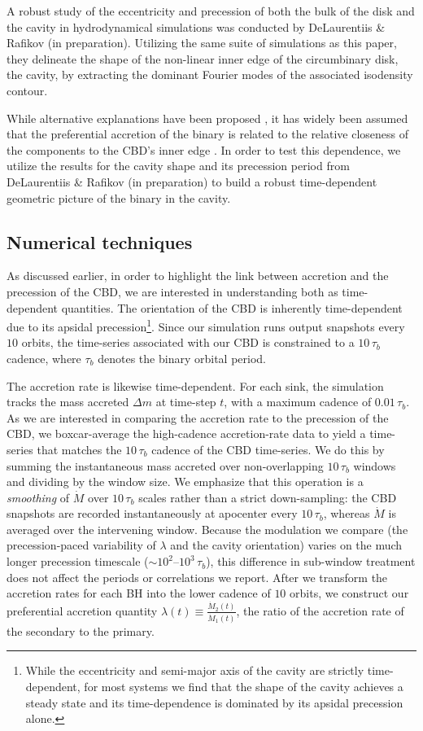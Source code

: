 \documentclass[fleqn,usenatbib]{mnras}
\begin{document}
A robust study of the eccentricity and precession of both the bulk of the disk and the cavity in hydrodynamical simulations was conducted by DeLaurentiis \& Rafikov (in preparation). Utilizing the same suite of simulations as this paper, they delineate the shape of the non-linear inner edge of the circumbinary disk, the cavity, by extracting the dominant Fourier modes of the associated isodensity contour.


While alternative explanations have been proposed \citep{Artimowicz_83_og_polish}, it has widely been assumed that the preferential accretion of the binary is related to the relative closeness of the components to the CBD's inner edge \citep{Dorazio+2013,Rafikov_16_accretion}. In order to test this dependence, we utilize the results for the cavity shape and its precession period from DeLaurentiis \& Rafikov (in preparation) to build a robust time-dependent geometric picture of the binary in the cavity.


\subsection{Numerical techniques}
As discussed earlier, in order to highlight the link between accretion and the precession of the CBD, we are interested in understanding both as time-dependent quantities. The orientation of the CBD is inherently time-dependent due to its apsidal precession\footnote{While the eccentricity and semi-major axis of the cavity are strictly time-dependent, for most systems we find that the shape of the cavity achieves a steady state and its time-dependence is dominated by its apsidal precession alone.}. Since our simulation runs output snapshots every $10$ orbits, the time-series associated with our CBD is constrained to a $10\,\tau_b$ cadence, where $\tau_b$ denotes the binary orbital period.


The accretion rate is likewise time-dependent. For each sink, the simulation tracks the mass accreted $\Delta m$ at time-step $t$, with a maximum cadence of $0.01\,\tau_b$. As we are interested in comparing the accretion rate to the precession of the CBD, we boxcar-average the high-cadence accretion-rate data to yield a time-series that matches the $10\,\tau_b$ cadence of the CBD time-series. We do this by summing the instantaneous mass accreted over non-overlapping $10\,\tau_b$ windows and dividing by the window size. We emphasize that this operation is a \textit{smoothing} of $\dot{M}$ over $10\,\tau_b$ scales rather than a strict down-sampling: the CBD snapshots are recorded instantaneously at apocenter every $10\,\tau_b$, whereas $\dot{M}$ is averaged over the intervening window. Because the modulation we compare (the precession-paced variability of $\lambda$ and the cavity orientation) varies on the much longer precession timescale ($\sim 10^2$--$10^3\,\tau_b$), this difference in sub-window treatment does not affect the periods or correlations we report. After we transform the accretion rates for each BH into the lower cadence of $10$ orbits, we construct our preferential accretion quantity $\lambda(t) \equiv \frac{\dot{M}_2(t)}{\dot{M}_1(t)}$, the ratio of the accretion rate of the secondary to the primary.
\end{document}
